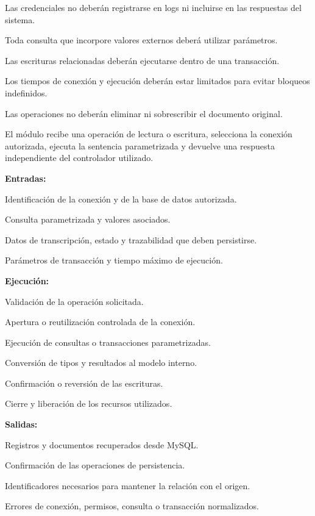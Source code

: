 \begin{definicionmodulo}
\item[Restricciones]
\begin{elementosmodulo}
    \item Las credenciales no deberán registrarse en logs ni incluirse en las respuestas del sistema.
    \item Toda consulta que incorpore valores externos deberá utilizar parámetros.
    \item Las escrituras relacionadas deberán ejecutarse dentro de una transacción.
    \item Los tiempos de conexión y ejecución deberán estar limitados para evitar bloqueos indefinidos.
    \item Las operaciones no deberán eliminar ni sobrescribir el documento original.
\end{elementosmodulo}

\item[Estructura general] El módulo recibe una operación de lectura o escritura, selecciona la conexión autorizada, ejecuta la sentencia parametrizada y devuelve una respuesta independiente del controlador utilizado.

\textbf{Entradas:}
\begin{elementosmodulo}
    \item Identificación de la conexión y de la base de datos autorizada.
    \item Consulta parametrizada y valores asociados.
    \item Datos de transcripción, estado y trazabilidad que deben persistirse.
    \item Parámetros de transacción y tiempo máximo de ejecución.
\end{elementosmodulo}

\textbf{Ejecución:}
\begin{elementosmodulo}
    \item Validación de la operación solicitada.
    \item Apertura o reutilización controlada de la conexión.
    \item Ejecución de consultas o transacciones parametrizadas.
    \item Conversión de tipos y resultados al modelo interno.
    \item Confirmación o reversión de las escrituras.
    \item Cierre y liberación de los recursos utilizados.
\end{elementosmodulo}

\textbf{Salidas:}
\begin{elementosmodulo}
    \item Registros y documentos recuperados desde MySQL.
    \item Confirmación de las operaciones de persistencia.
    \item Identificadores necesarios para mantener la relación con el origen.
    \item Errores de conexión, permisos, consulta o transacción normalizados.
\end{elementosmodulo}

\end{definicionmodulo}


